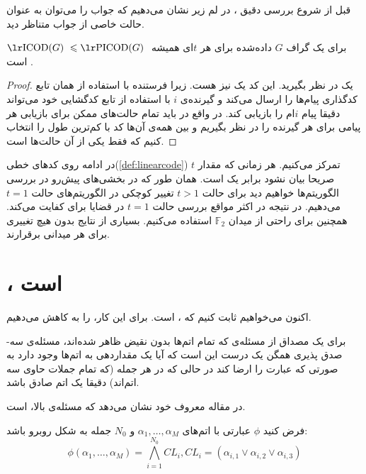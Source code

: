 قبل از شروع بررسی دقیق \picod، در لم زیر نشان می‌دهیم که جواب \picod را می‌توان به عنوان حالت خاصی از جواب \icod متناظر دید.
\begin{lemma}
	برای یک گراف
	$G$
	داده‌شده برای هر
	$t$ای همیشه
	$\icodg \leq \picodg$
	است \cite{pliablefirstpaper}.
\end{lemma}
\begin{proof}
	یک 
	\icod
	در نظر بگیرید. این کد یک
	\picod
	نیز هست. زیرا فرستنده با استفاده از همان تابع کدگذاری پیام‌ها را ارسال می‌کند و گیرنده‌ی
	$i$
	با استفاده از تابع کدگشایی خود می‌تواند دقیقا	 پیام
	$i$ام را بازیابی کند. در واقع در
	\picod
	باید تمام حالت‌های ممکن برای بازیابی هر پیامی برای هر گیرنده را در نظر بگیریم و بین همه‌ی آن‌ها کد با کم‌ترین طول را انتخاب کنیم که 
	\icod
	فقط یکی از آن حالت‌ها است.
\end{proof}


در ادامه روی کدهای خطی(\autoref{def:linearcode}) تمرکز می‌کنیم. هر زمانی که مقدار
$t$
صریحا بیان نشود برابر یک است. همان طور که در بخشی‌های پیش‌رو در بررسی الگوریتم‌ها خواهیم دید برای حالت
$t > 1$
تغییر کوچکی در الگوریتم‌های حالت
$t = 1$
می‌دهیم. در نتیجه در اکثر مواقع بررسی حالت
$t = 1$
در قضایا برای کفایت می‌کند. همچنین برای راحتی از میدان
$\mathbb{F}_2$
استفاده می‌کنیم. بسیاری از نتایج بدون هیچ تغییری برای هر میدانی برقرارند.

\section{\lpicod،
\nphard
 است}
اکنون می‌خواهیم ثابت کنیم که
،
\nphard
است. برای این کار، 
\lpicod
 را به
کاهش می‌دهیم.

\begin{definition}
	برای یک مصداق از مسئله‌ی 
که تمام اتم‌ها بدون نقیض ظاهر شده‌اند، مسئله‌ی سه-صدق پذیری همگن یک درست این است که آیا یک مقداردهی به اتم‌ها وجود دارد به صورتی که عبارت را ارضا کند در حالی که در هر جمله (که تمام جملات حاوی سه اتم‌اند) دقیقا یک اتم صادق باشد.
\end{definition}

در مقاله معروف خود
\cite{10.1145/800133.804350}
نشان می‌دهد که مسئله‌ی بالا، 
\nphard
است.

فرض کنید
$\phi$
عبارتی با اتم‌های
$\alpha_1, \ldots, \alpha_M$
و
$N_0$
جمله به شکل روبرو باشد:
$$\phi(\alpha_1, \ldots, \alpha_M) = \bigwedge\limits_{i = 1}^{N_0} CL_i, CL_i = (\alpha_{i, 1} \vee \alpha_{i, 2} \vee \alpha_{i, 3})$$

